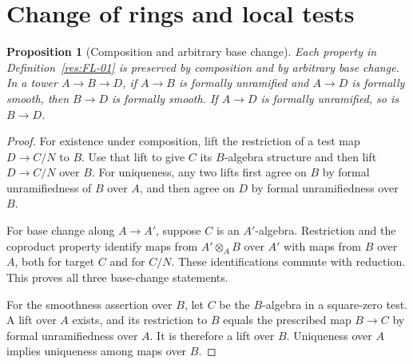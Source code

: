 \documentclass[11pt,oneside,openany]{book}
\newtheorem{proposition}[theorem]{Proposition}
\theoremstyle{definition}
\theoremstyle{remark}
\begin{document}
\section{Change of rings and local tests}

\begin{proposition}[Composition and arbitrary base change]\label{res:FL-09}
Each property in Definition~\ref{res:FL-01} is preserved by composition and
by arbitrary base change. In a tower $A\to B\to D$, if $A\to B$ is
formally unramified and $A\to D$ is formally smooth, then $B\to D$ is
formally smooth. If $A\to D$ is formally unramified, so is $B\to D$.
\end{proposition}
\begin{proof}
For existence under composition, lift the restriction of a test map
$D\to C/N$ to $B$. Use that lift to give $C$ its $B$-algebra structure and
then lift $D\to C/N$ over $B$. For uniqueness, any two lifts first agree on
$B$ by formal unramifiedness of $B$ over $A$, and then agree on $D$ by formal
unramifiedness over $B$.

For base change along $A\to A'$, suppose $C$ is an $A'$-algebra. Restriction
and the coproduct property identify maps from $A'\otimes_A B$ over $A'$ with
maps from $B$ over $A$, both for target $C$ and for $C/N$. These identifications
commute with reduction. This proves all three base-change statements.

For the smoothness assertion over $B$, let $C$ be the $B$-algebra in a
square-zero test. A lift over $A$ exists, and its restriction to $B$ equals
the prescribed map $B\to C$ by formal unramifiedness over $A$. It is therefore
a lift over $B$. Uniqueness over $A$ implies uniqueness among maps over $B$.
\end{proof}
\end{document}
